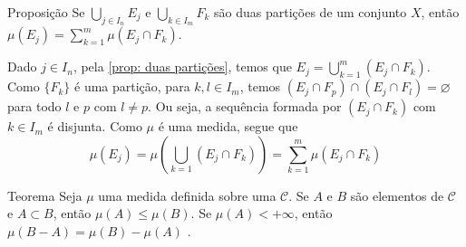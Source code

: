 \begin{comment}
	\begin{env}{Exemplo}
		Seja $X = \N$ e $\mathcal{C}$ sendo o conjunto das partes de $\N$. 
		para $A \in \mathcal{C}$, definimos $\mu(A)$ por meio da sua cardinalidade, isto é, se $A$ é finito, então $\mu(A)$ é quantidade de elementos de $A$. Caso contrário, $\mu(A) = +\infty$.	
	\end{env}
\end{comment}


\begin{env}{Proposição}
	\label{prop: medida com partição}
	Se $\displaystyle \bigcup_{j \in I_n} E_j$ e $\displaystyle\bigcup_{k \in I_m} F_k$ são duas partições de um conjunto $X$, então 
	$\displaystyle \mu(E_j) 
	= 
	\sum_{k = 1}^{m} \mu(E_j\cap F_k)$.
\end{env}

\begin{prova}
	Dado $j \in I_n$, pela \ref{prop: duas partições}, temos que
	$E_j = \displaystyle \bigcup_{k = 1}^m (E_j\cap F_k)$.
	Como $\{F_k\}$ é uma partição, para $k,l \in I_m$, temos
	$(E_j\cap F_p) \cap (E_j\cap F_l) = \varnothing$ para todo $l$ e $p$ com  $l \neq p$.
	Ou seja, a sequência formada por $(E_j\cap F_k)$ com $k \in I_m$ é disjunta.
	Como $\mu$ é uma medida, segue que
	$$
	\mu(E_j)
	=
	\mu\left(\bigcup_{k = 1} (E_j\cap F_k)\right)
	=
	\sum_{k = 1}^{m}\mu(E_j\cap F_k)
	$$
\end{prova}

\begin{comment}
	

\begin{env}{Proposição}
	\label{prop: igualdade da caracteristica como medida}
	Se $\displaystyle \bigcup_{j \in I_n} E_j$ e $\displaystyle\bigcup_{k \in I_m} F_k$ são duas partições de um conjunto $X$, então 
	$\displaystyle \chi_{E_j} = \sum_{k = 1}^{m} \chi_{(E_j\cap F_k)}$.
\end{env}

\begin{prova}
	Pela \ref{prop: igualdade da caracteristica como medida}, $\chi$ é uma medida. Segue pela \ref{prop: medida com partição} que
	$\displaystyle \chi_{E_j} = \sum_{k = 1}^{m} \chi_{(E_j\cap F_k)}$.
\end{prova}
\end{comment}

\begin{env}{Teorema}
\label{teo:medida-diferença}
	Seja $\mu$ uma medida definida sobre uma \sigal $\mathcal{C}$.
	Se $A$ e $B$ são elementos de $\mathcal{C}$ e $A \subset B$, então $\mu(A) \leq \mu(B)$.
	Se $\mu(A) < +\infty$, então $\mu(B-A) = \mu(B) - \mu(A)$ \cite{bartle}.
\end{env}

